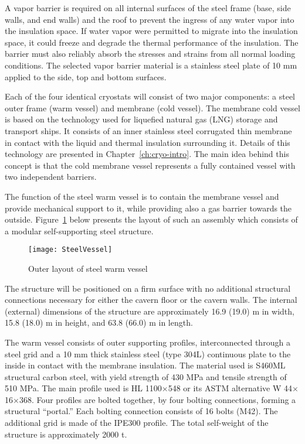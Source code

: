 A vapor barrier is required on all internal surfaces of the 
steel frame (base, side walls, and end walls) and the roof to 
prevent the ingress of any water vapor into the insulation 
space. If water vapor were permitted to migrate into the 
insulation space, it could freeze and degrade the thermal 
performance of the insulation. The barrier must also 
reliably absorb the stresses and strains from all normal 
loading conditions. The selected vapor barrier material 
is a stainless steel plate of 10 mm applied to the side,
top and bottom surfaces. 

Each of the four identical cryostats will consist of two 
major components: a steel outer frame (warm vessel) and 
membrane (cold vessel). The membrane cold vessel is based 
on the technology used for liquefied natural gas (LNG) 
storage and transport ships. It consists of an inner 
stainless steel corrugated thin membrane in contact with 
the liquid and thermal insulation surrounding it. Details 
of this technology are presented in Chapter~\ref{ch:cryo-intro}. 
The main idea behind this concept is that the cold membrane vessel 
represents a fully contained vessel with two independent 
barriers.

The function of the steel warm vessel is to contain the membrane 
vessel and provide mechanical support to it, while providing 
also a gas barrier towards the outside. Figure~\ref{fig:SteelVessel} 
below presents the layout of such an assembly which consists
of a modular self-supporting steel structure.

\begin{figure}[htbp]
\centering
\texttt{[image: SteelVessel]}
\caption[Outer layout of steel warm vessel]{Outer layout of steel warm vessel}
\label{fig:SteelVessel}
\end{figure}

The structure will be positioned on a firm surface with 
no additional structural connections necessary for either 
the cavern floor or the cavern walls. The internal (external) 
dimensions of the structure are approximately 16.9 (19.0) m 
in width, 15.8 (18.0) m in height, and 63.8 (66.0) m in length.

The warm vessel consists of outer supporting profiles, interconnected 
through a steel grid and a 10 mm thick stainless steel (type 304L) 
continuous plate to the inside in contact with the membrane insulation.
The material used is S460ML structural carbon steel, with yield 
strength of 430 MPa and tensile strength of 510 MPa. The main 
profile used is HL 1100$\times$548 or its ASTM alternative 
W 44$\times$16$\times$368. Four profiles are bolted together, by 
four bolting connections, forming a structural ``portal.'' Each 
bolting connection consists of 16 bolts (M42). The additional 
grid is made of the IPE300 profile. The total self-weight of 
the structure is approximately 2000 t.

